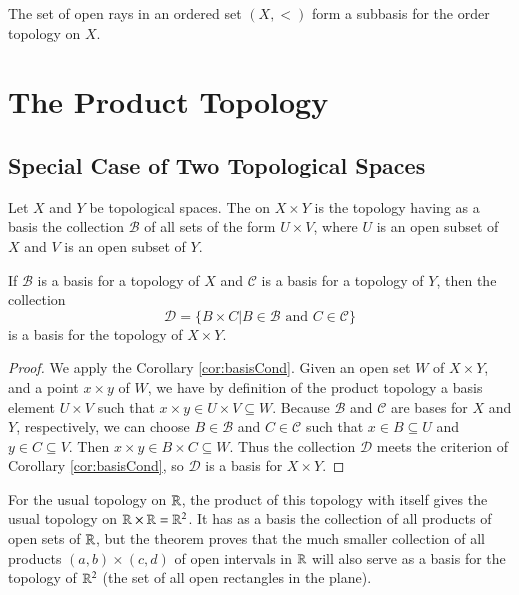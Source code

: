 \documentclass[12pt, a4paper, oneside, openright, titlepage]{book}
\begin{document}
\begin{rmk}
    The set of open rays in an ordered set $(X,<)$ form a subbasis for the order topology on $X$.
\end{rmk}


\section{The Product Topology}

\subsection{Special Case of Two Topological Spaces}

\begin{defn}
    Let $X$ and $Y$ be topological spaces. The  on $X\times Y$ is the topology having as a basis the collection $\mathcal{B}$ of all sets of the form $U\times V$, where $U$ is an open subset of $X$ and $V$ is an open subset of $Y$.
\end{defn}


\begin{thm}
    If $\mathcal{B}$ is a basis for a topology of $X$ and $\mathcal{C}$ is a basis for a topology of $Y$, then the collection\begin{equation*}
        \mathcal{D} = \{B\times C\vert B \in \mathcal{B}\text{ and } C \in \mathcal{C}\}
    \end{equation*}
    is a basis for the topology of $X\times Y$.
\end{thm}
\begin{proof}
    We apply the Corollary \ref{cor:basisCond}. Given an open set $W$ of $X\times Y$, and a point $x\times y$ of $W$, we have by definition of the product topology a basis element $U\times V$ such that $x\times y \in U\times V \subseteq W$. Because $\mathcal{B}$ and $\mathcal{C}$ are bases for $X$ and $Y$, respectively, we can choose $B \in \mathcal{B}$ and $C \in \mathcal{C}$ such that $x \in B \subseteq U$ and $y \in C \subseteq V$. Then $x \times y \in B\times C\subseteq W$. Thus the collection $\mathcal{D}$ meets the criterion of Corollary \ref{cor:basisCond}, so $\mathcal{D}$ is a basis for $X\times Y$.
\end{proof}


\begin{eg}
    For the usual topology on $\mathbb R$, the product of this topology with itself gives the usual topology on $\mathbb R\times \mathbb R = \mathbb R^2$. It has as a basis the collection of all products of open sets of $\mathbb R$, but the theorem proves that the much smaller collection of all products $(a,b)\times(c,d)$ of open intervals in $\mathbb R$ will also serve as a basis for the topology of $\mathbb R^2$ (the set of all open rectangles in the plane).
\end{eg}
\end{document}
